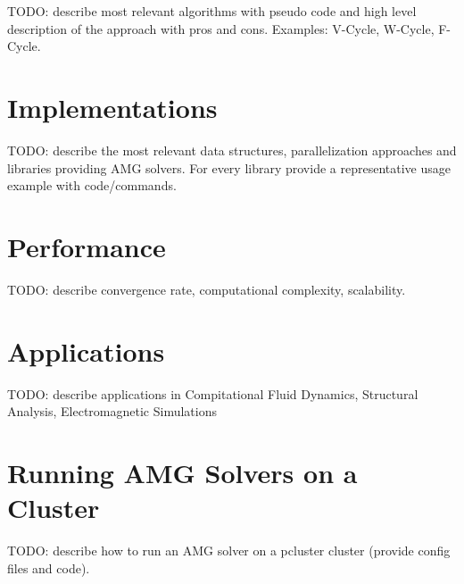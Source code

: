 TODO: describe most relevant algorithms with pseudo code and high level description of the approach with pros
and cons. Examples: V-Cycle, W-Cycle, F-Cycle.

\section{Implementations}
\label{sec:implementations}

TODO: describe the most relevant data structures, parallelization approaches and libraries providing AMG
solvers. For every library provide a representative usage example with code/commands.

\section{Performance}
\label{sec:performance}

TODO: describe convergence rate, computational complexity, scalability.

\section{Applications}
\label{sec:algebraic-multi-grid-solvers-applications}

TODO: describe applications in Compitational Fluid Dynamics, Structural Analysis, Electromagnetic Simulations

\section{Running AMG Solvers on a Cluster}
\label{sec:running-amg-solvers-on-a-cluster}

TODO: describe how to run an AMG solver on a pcluster cluster (provide config files and code).
